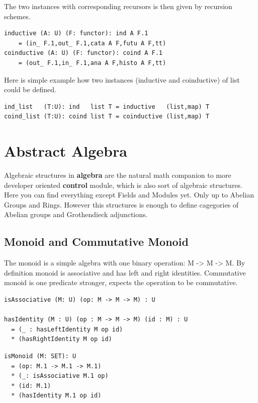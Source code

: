 \documentclass{article}
\begin{document}
The two instances with corresponding recursors is then given by recursion schemes.

\begin{lstlisting}[mathescape=true]
inductive (A: U) (F: functor): ind A F.1
    = (in_ F.1,out_ F.1,cata A F,futu A F,tt)
coinductive (A: U) (F: functor): coind A F.1
    = (out_ F.1,in_ F.1,ana A F,histo A F,tt)
\end{lstlisting}

Here is simple example how two instances (inductive and coinductive) of list could be defined.

\begin{lstlisting}[mathescape=true]
ind_list   (T:U): ind   list T = inductive   (list,map) T
coind_list (T:U): coind list T = coinductive (list,map) T
\end{lstlisting}

\section{Abstract Algebra}

Algebraic structures in {\bf algebra} are the natural math companion to
more developer oriented {\bf control} module, which is also sort of algebraic structures.
Here you can find everything except Fields and Modules yet. Only up to Abelian Groups and Rings.
However this structures is enough to define cagegories of Abelian groups and Grothendieck adjunctions.

\subsection{Monoid and Commutative Monoid}

The monoid is a simple algebra with one binary operation: M -> M -> M.
By definition monoid is associative and has left and right identities.
Commutative monoid is one predicate stronger, expects the operation
to be commutative.

\begin{lstlisting}[mathescape=true]
isAssociative (M: U) (op: M -> M -> M) : U

hasIdentity (M : U) (op : M -> M -> M) (id : M) : U
  = (_ : hasLeftIdentity M op id)
  * (hasRightIdentity M op id)
\end{lstlisting}

\begin{lstlisting}[mathescape=true]
isMonoid (M: SET): U
  = (op: M.1 -> M.1 -> M.1)
  * (_: isAssociative M.1 op)
  * (id: M.1)
  * (hasIdentity M.1 op id)
\end{lstlisting}
\end{document}
